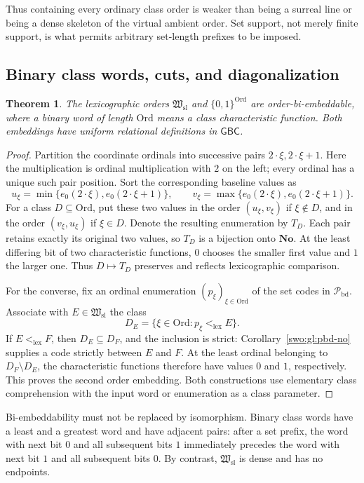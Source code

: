 \documentclass[11pt]{article}
\newtheorem{theorem}{Theorem}[section]
\theoremstyle{definition}
\theoremstyle{remark}
\newcommand{\No}{\mathbf{No}}
\newcommand{\Ord}{\mathrm{Ord}}
\newcommand{\Hsl}{\mathfrak W_{\mathrm{sl}}}
\newcommand{\Pbd}{\mathcal P_{\mathrm{bd}}}
\newcommand{\lex}{\mathrm{lex}}
\newcommand{\GBC}{\mathsf{GBC}}
\begin{document}
Thus containing every ordinary class order is weaker than being a
surreal line or being a dense skeleton of the virtual ambient order.
Set support, not merely finite support, is what permits arbitrary
set-length prefixes to be imposed.

\subsection{Binary class words, cuts, and diagonalization}

\begin{theorem}\label{swo:gl:binary}
The lexicographic orders $\Hsl$ and $\{0,1\}^{\Ord}$ are order-bi-embeddable,
where a binary word of length $\Ord$ means a class characteristic function.
Both embeddings have uniform relational definitions in $\GBC$.
\end{theorem}

\begin{proof}
Partition the coordinate ordinals into successive pairs
$2\cdot\xi,2\cdot\xi+1$.  Here the multiplication is ordinal multiplication
with $2$ on the left; every ordinal has a unique such pair position.  Sort
the corresponding baseline values as
\[
 u_\xi=\min\{e_0(2\cdot\xi),e_0(2\cdot\xi+1)\},\qquad
 v_\xi=\max\{e_0(2\cdot\xi),e_0(2\cdot\xi+1)\}.
\]
For a class $D\subseteq\Ord$, put these two values in the order
$(u_\xi,v_\xi)$ if $\xi\notin D$, and in the order $(v_\xi,u_\xi)$ if
$\xi\in D$.  Denote the resulting enumeration by $T_D$.  Each pair retains
exactly its original two values, so $T_D$ is a bijection onto $\No$.  At the
least differing bit of two characteristic functions, $0$ chooses the smaller
first value and $1$ the larger one.  Thus $D\mapsto T_D$ preserves and
reflects lexicographic comparison.

For the converse, fix an ordinal enumeration $(p_\xi)_{\xi\in\Ord}$ of
the set codes in $\Pbd$.  Associate with $E\in\Hsl$ the class
\[
 D_E=\{\xi\in\Ord:p_\xi<_{\lex}E\}.
\]
If $E<_{\lex}F$, then $D_E\subseteq D_F$, and the inclusion is strict:
Corollary~\ref{swo:gl:pbd-no} supplies a code strictly between $E$ and $F$.
At the least ordinal belonging to $D_F\setminus D_E$, the characteristic
functions therefore have values $0$ and $1$, respectively.  This proves the
second order embedding.  Both constructions use elementary class
comprehension with the input word or enumeration as a class parameter.
\end{proof}

Bi-embeddability must not be replaced by isomorphism.  Binary class words have
a least and a greatest word and have adjacent pairs: after a set prefix,
the word with next bit $0$ and all subsequent bits $1$ immediately precedes
the word with next bit $1$ and all subsequent bits $0$.  By contrast,
$\Hsl$ is dense and has no endpoints.
\end{document}
